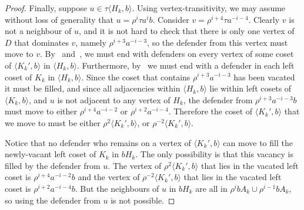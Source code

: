 \documentclass{amsart}
\theoremstyle{remark}
\theoremstyle{definition}
\begin{document}
\begin{proof}
    Finally, suppose $u \in \tau\langle H_k,b\rangle$. Using vertex-transitivity, we may assume without loss of generality that $u=\rho^i\tau a^i b$. Consider $v=\rho^{i+4}\tau a^{-i-4}$. Clearly $v$ is not a neighbour of $u$, and it is not hard to check that there is only one vertex of $D$ that dominates $v$, namely $\rho^{i+3}a^{-i-3}$, so the defender from this vertex must move to $v$. By~ and~, we must end with defenders on every vertex of some coset of $\langle K_k',b\rangle$ in $\langle H_k,b\rangle$. Furthermore, by~ we must end with a defender in each left coset of $K_k$ in $\langle H_k,b\rangle$. Since the coset that contains $\rho^{i+3}a^{-i-3}$ has been vacated it must be filled, and since all adjacencies within $\langle H_k,b\rangle$ lie within left cosets of $\langle K_k,b\rangle$, and $u$ is not adjacent to any vertex of $H_k$, the defender from $\rho^{i+3}a^{-i-3}b$ must move to either $\rho^{i+4}a^{-i-2}$ or $\rho^{i+2}a^{-i-4}$. Therefore the coset of $\langle K_k',b\rangle$ that we move to must be either $\rho^{2}\langle K_k',b\rangle$, or $\rho^{-2}\langle K_k',b\rangle$. 

    Notice that no defender who remains on a vertex of $\langle K_k',b\rangle$ can move to fill the newly-vacant left coset of $K_k$ in $bH_k$. The only possibility is that this vacancy is filled by the defender from $u$. The vertex of $\rho^{2}\langle K_k',b\rangle$ that lies in the vacated left coset is $\rho^{i+4}a^{-i-2}b$
    and the vertex of $\rho^{-2}\langle K_k',b\rangle$ that lies in the vacated left coset is $\rho^{i+2}a^{-i-4}b$. But the neighbours of $u$ in $bH_k$ are all in $\rho^i b A_k \cup \rho^{i-1}bA_k$, so using the defender from $u$ is not possible.
\end{proof}
\end{document}
